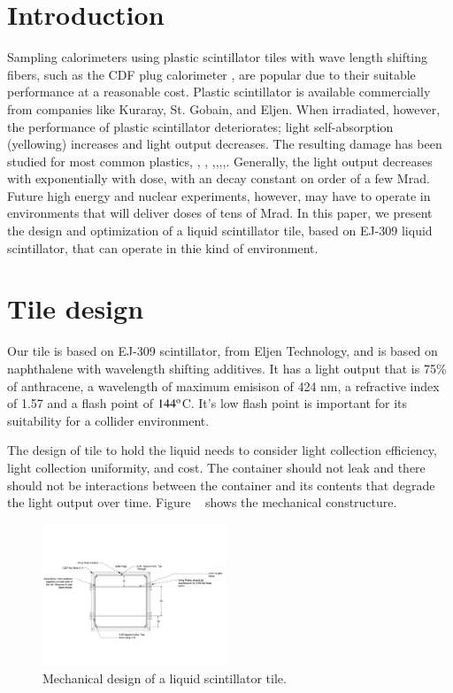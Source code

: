 \documentclass[review]{elsarticle}
\begin{document}
\section{Introduction}
Sampling calorimeters using plastic scintillator tiles with wave length shifting fibers, such as the CDF plug calorimeter \cite{Albrow20022524}, are popular due to their suitable performance at a reasonable cost.  Plastic scintillator is available commercially from companies like Kuraray, St. Gobain, and Eljen.  When irradiated, however, the performance of plastic scintillator deteriorates; light self-absorption (yellowing) increases and light output decreases.  The resulting damage has been studied for most common plastics\cite{34504}, \cite{Wick1991472}, \cite{289295},
\cite{173180},\cite{467829},\cite{Wulkop1995141},\cite{173178},\cite{vasken}.  Generally, the light output decreases with exponentially with dose, with an decay constant on order of a few Mrad.  Future high energy and nuclear experiments, however, may have to operate in environments that will deliver doses of tens of Mrad.  In this paper, we present the design and optimization of a liquid scintillator tile, based on EJ-309 liquid scintillator, that can operate in thie kind of environment.


\section{Tile design}

Our tile is based on EJ-309 scintillator, from Eljen Technology, and is based on naphthalene with wavelength shifting additives.  It has a light output that is 75\% of anthracene, a wavelength of maximum emisison of 424 nm, a refractive index of 1.57 and a flash point of $\rm{144^o}$C.  It's low flash point is important for its suitability for a collider environment.

The design of tile to hold the liquid needs to consider light collection efficiency, light collection uniformity, and cost.  The container should not leak and there should not be interactions between the container and its contents that degrade the light output over time.  Figure ~\cite{fig:tiledesign} shows the mechanical constructure.


\begin{figure}[!ht]
\begin{center}
\includegraphics[width=0.49\textwidth]{mechanicaldesign.pdf}
\caption{
Mechanical design of a liquid scintillator tile.
}
\label{fig:tiledesign}
\end{center}
\end{figure}
\end{document}
